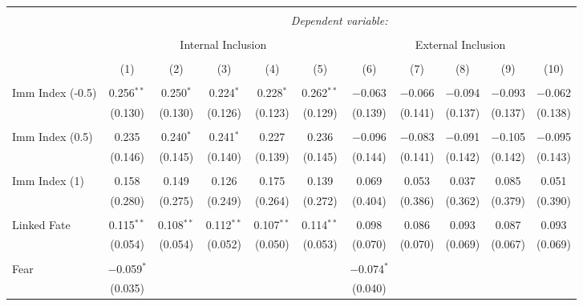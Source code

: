 
\begin{table}[!htbp] \centering 
  \caption{} 
  \label{} 
\begin{tabular}{@{\extracolsep{5pt}}lcccccccccc} 
\\[-1.8ex]\hline 
\hline \\[-1.8ex] 
 & \multicolumn{10}{c}{\textit{Dependent variable:}} \\ 
\cline{2-11} 
\\[-1.8ex] & \multicolumn{5}{c}{Internal Inclusion} & \multicolumn{5}{c}{External Inclusion} \\ 
\\[-1.8ex] & (1) & (2) & (3) & (4) & (5) & (6) & (7) & (8) & (9) & (10)\\ 
\hline \\[-1.8ex] 
 Imm Index (-0.5) & 0.256$^{**}$ & 0.250$^{*}$ & 0.224$^{*}$ & 0.228$^{*}$ & 0.262$^{**}$ & $-$0.063 & $-$0.066 & $-$0.094 & $-$0.093 & $-$0.062 \\ 
  & (0.130) & (0.130) & (0.126) & (0.123) & (0.129) & (0.139) & (0.141) & (0.137) & (0.137) & (0.138) \\ 
  & & & & & & & & & & \\ 
 Imm Index (0.5) & 0.235 & 0.240$^{*}$ & 0.241$^{*}$ & 0.227 & 0.236 & $-$0.096 & $-$0.083 & $-$0.091 & $-$0.105 & $-$0.095 \\ 
  & (0.146) & (0.145) & (0.140) & (0.139) & (0.145) & (0.144) & (0.141) & (0.142) & (0.142) & (0.143) \\ 
  & & & & & & & & & & \\ 
 Imm Index (1) & 0.158 & 0.149 & 0.126 & 0.175 & 0.139 & 0.069 & 0.053 & 0.037 & 0.085 & 0.051 \\ 
  & (0.280) & (0.275) & (0.249) & (0.264) & (0.272) & (0.404) & (0.386) & (0.362) & (0.379) & (0.390) \\ 
  & & & & & & & & & & \\ 
 Linked Fate & 0.115$^{**}$ & 0.108$^{**}$ & 0.112$^{**}$ & 0.107$^{**}$ & 0.114$^{**}$ & 0.098 & 0.086 & 0.093 & 0.087 & 0.093 \\ 
  & (0.054) & (0.054) & (0.052) & (0.050) & (0.053) & (0.070) & (0.070) & (0.069) & (0.067) & (0.069) \\ 
  & & & & & & & & & & \\ 
 Fear & $-$0.059$^{*}$ &  &  &  &  & $-$0.074$^{*}$ &  &  &  &  \\ 
  & (0.035) &  &  &  &  & (0.040) &  &  &  &  \\ 

\end{tabular}
\end{table}
